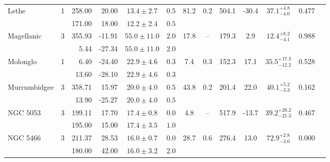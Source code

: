 \begin{tabular}{lcrrccccccccr}
	\multirow{2}{*}{Lethe} & \multirow{2}{*}{1} & 258.00 & 20.00 & $13.4 \pm 2.7$ & $0.5$ & \multirow{2}{*}{81.2} & \multirow{2}{*}{0.2} & \multirow{2}{*}{504.1} & \multirow{2}{*}{-30.4} & \multirow{2}{*}{$37.1^{+4.8}_{-4.0}$} & \multirow{2}{*}{0.477} & \multirow{2}{*}{\citet{Grillmair:2009}} \\
	 &  & 171.00 & 18.00 & $12.2 \pm 2.4$ & $0.5$ &  &  &  &  &  &  &  \\
	\multirow{2}{*}{Magellanic} & \multirow{2}{*}{3} & 355.93 & -11.91 & $55.0 \pm 11.0$ & $2.0$ & \multirow{2}{*}{17.8} & \multirow{2}{*}{--} & \multirow{2}{*}{179.3} & \multirow{2}{*}{2.9} & \multirow{2}{*}{$12.4^{+8.2}_{-4.1}$} & \multirow{2}{*}{0.988} & \multirow{2}{*}{\citet{Bruns:2005}} \\
	 &  & 5.44 & -27.34 & $55.0 \pm 11.0$ & $2.0$ &  &  &  &  &  &  &  \\
	\multirow{2}{*}{Molonglo} & \multirow{2}{*}{1} & 6.40 & -24.40 & $22.9 \pm 4.6$ & $0.3$ & \multirow{2}{*}{7.4} & \multirow{2}{*}{0.3} & \multirow{2}{*}{152.3} & \multirow{2}{*}{17.1} & \multirow{2}{*}{$35.5^{+17.3}_{-12.2}$} & \multirow{2}{*}{0.528} & \multirow{2}{*}{\citet{Shipp:2018}} \\
	 &  & 13.60 & -28.10 & $22.9 \pm 4.6$ & $0.3$ &  &  &  &  &  &  &  \\
	\multirow{2}{*}{Murrumbidgee} & \multirow{2}{*}{3} & 358.71 & 15.97 & $20.0 \pm 4.0$ & $0.5$ & \multirow{2}{*}{43.8} & \multirow{2}{*}{0.2} & \multirow{2}{*}{201.4} & \multirow{2}{*}{22.0} & \multirow{2}{*}{$40.1^{+5.2}_{-3.3}$} & \multirow{2}{*}{0.162} & \multirow{2}{*}{\citet{Grillmair:2017b}} \\
	 &  & 13.90 & -25.27 & $20.0 \pm 4.0$ & $0.5$ &  &  &  &  &  &  &  \\
	\multirow{2}{*}{NGC 5053} & \multirow{2}{*}{3} & 199.11 & 17.70 & $17.4 \pm 0.8$ & $0.0$ & \multirow{2}{*}{4.8} & \multirow{2}{*}{--} & \multirow{2}{*}{517.9} & \multirow{2}{*}{-13.7} & \multirow{2}{*}{$39.2^{+20.2}_{-21.3}$} & \multirow{2}{*}{0.467} & \multirow{2}{*}{\citet{Lauchner:2006}} \\
	 &  & 195.00 & 15.00 & $17.4 \pm 3.5$ & $1.0$ &  &  &  &  &  &  &  \\
	\multirow{2}{*}{NGC 5466} & \multirow{2}{*}{3} & 211.37 & 28.53 & $16.0 \pm 0.7$ & $0.0$ & \multirow{2}{*}{28.7} & \multirow{2}{*}{0.6} & \multirow{2}{*}{276.4} & \multirow{2}{*}{13.0} & \multirow{2}{*}{$72.9^{+2.8}_{-3.0}$} & \multirow{2}{*}{0.000} & \multirow{2}{*}{\citet{Grillmair:2006b}} \\
	 &  & 180.00 & 42.00 & $16.0 \pm 3.2$ & $2.0$ &  &  &  &  &  &  &  \\
	\bottomrule
\end{tabular}
